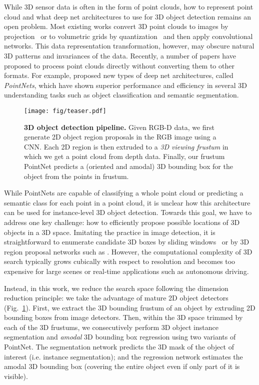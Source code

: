 \documentclass[10pt,twocolumn,letterpaper]{article}
\begin{document}
While 3D sensor data is often in the form of point clouds, how to represent point cloud and what deep net architectures to use for 3D object detection remains an open problem. Most existing works convert 3D point clouds to images by projection~\cite{su15mvcnn,qi2016volumetric} or to volumetric grids by quantization~\cite{wu20153d,maturana2015voxnet,qi2016volumetric} and then apply convolutional networks. This data representation transformation, however, may obscure natural 3D patterns and invariances of the data. Recently, a number of papers have proposed to process point clouds directly without converting them to other formats. For example, \cite{qi2017pointnet, qi2017pointnetplusplus} proposed new types of deep net architectures, called \emph{PointNets}, which have shown superior performance and efficiency in several 3D understanding tasks such as object classification and semantic segmentation.

\begin{figure}[t!]
    \centering
    \texttt{[image: fig/teaser.pdf]}
    \caption{\textbf{3D object detection pipeline.} Given RGB-D data, we first generate 2D object region proposals in the RGB image using a CNN. Each 2D region is then extruded to a \emph{3D viewing frustum} in which we get a point cloud from depth data. Finally, our frustum PointNet predicts a (oriented and amodal) 3D bounding box for the object from the points in frustum.}
    \label{fig:teaser}
\end{figure}

While PointNets are capable of classifying a whole point cloud or predicting a semantic class for each point in a point cloud, it is unclear how this architecture can be used for instance-level 3D object detection. Towards this goal, we have to address one key challenge: how to efficiently propose possible locations of 3D objects in a 3D space. Imitating the practice in image detection, it is straightforward to enumerate candidate 3D boxes by sliding windows~\cite{engelcke2017vote3deep} or by 3D region proposal networks such as \cite{song2015sun}. However, the computational complexity of 3D search typically grows cubically with respect to resolution and becomes too expensive for large scenes or real-time applications such as autonomous driving. 

Instead, in this work, we reduce the search space following the dimension reduction principle: we take the advantage of mature 2D object detectors (Fig.~\ref{fig:teaser}). First, we extract the 3D bounding frustum of an object by extruding 2D bounding boxes from image detectors. Then, within the 3D space trimmed by each of the 3D frustums, we consecutively perform 3D object instance segmentation and \emph{amodal} 3D bounding box regression using two variants of PointNet. The segmentation network predicts the 3D mask of the object of interest (i.e. instance segmentation); and the regression network estimates the amodal 3D bounding box (covering the entire object even if only part of it is visible).
\end{document}
